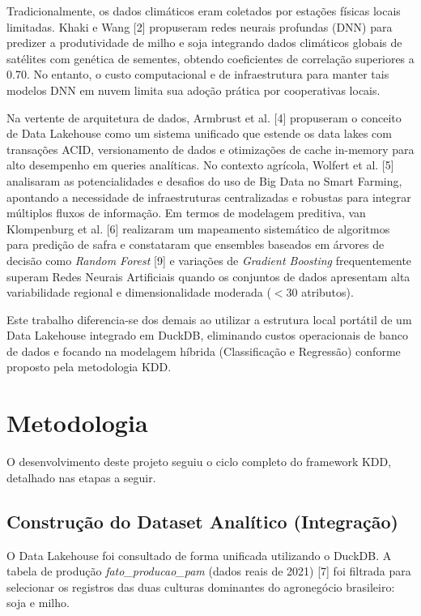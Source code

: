 \documentclass[conference]{IEEEtran}
\begin{document}
Tradicionalmente, os dados climáticos eram coletados por estações físicas locais limitadas. Khaki e Wang [2] propuseram redes neurais profundas (DNN) para predizer a produtividade de milho e soja integrando dados climáticos globais de satélites com genética de sementes, obtendo coeficientes de correlação superiores a 0.70. No entanto, o custo computacional e de infraestrutura para manter tais modelos DNN em nuvem limita sua adoção prática por cooperativas locais.

Na vertente de arquitetura de dados, Armbrust et al. [4] propuseram o conceito de Data Lakehouse como um sistema unificado que estende os data lakes com transações ACID, versionamento de dados e otimizações de cache in-memory para alto desempenho em queries analíticas. No contexto agrícola, Wolfert et al. [5] analisaram as potencialidades e desafios do uso de Big Data no Smart Farming, apontando a necessidade de infraestruturas centralizadas e robustas para integrar múltiplos fluxos de informação. Em termos de modelagem preditiva, van Klompenburg et al. [6] realizaram um mapeamento sistemático de algoritmos para predição de safra e constataram que ensembles baseados em árvores de decisão como \textit{Random Forest} [9] e variações de \textit{Gradient Boosting} frequentemente superam Redes Neurais Artificiais quando os conjuntos de dados apresentam alta variabilidade regional e dimensionalidade moderada ($< 30$ atributos).

Este trabalho diferencia-se dos demais ao utilizar a estrutura local portátil de um Data Lakehouse integrado em DuckDB, eliminando custos operacionais de banco de dados e focando na modelagem híbrida (Classificação e Regressão) conforme proposto pela metodologia KDD.

\section{Metodologia}
O desenvolvimento deste projeto seguiu o ciclo completo do framework KDD, detalhado nas etapas a seguir.

\subsection{Construção do Dataset Analítico (Integração)}
O Data Lakehouse foi consultado de forma unificada utilizando o DuckDB. A tabela de produção \textit{fato\_producao\_pam} (dados reais de 2021) [7] foi filtrada para selecionar os registros das duas culturas dominantes do agronegócio brasileiro: soja e milho. 
\end{document}

